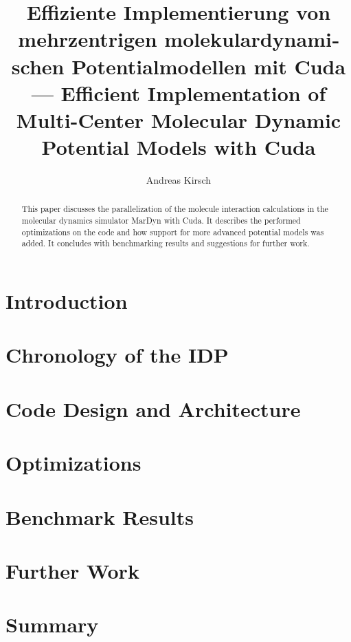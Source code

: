 \documentclass[11pt,a4paper,onecolumn,notitlepage]{scrartcl}
\author{Andreas Kirsch}
\title{\foreignlanguage{ngerman}{Effiziente Implementierung von mehrzentrigen molekulardynamischen Potentialmodellen mit Cuda} \linebreak --- \linebreak Efficient Implementation of Multi-Center Molecular Dynamic Potential Models with Cuda}
\newcommand{\cuda}{Cuda}
\begin{document}
\maketitle

\begin{abstract}
This paper discusses the parallelization of the molecule interaction calculations in the molecular dynamics simulator MarDyn with \cuda. It describes the performed optimizations on the code and how support for more advanced potential models was added. It concludes with benchmarking results and suggestions for further work.
\end{abstract}

\section{Introduction}



\section{Chronology of the IDP}



\section{Code Design and Architecture}



\section{Optimizations}



\section{Benchmark Results}



\section{Further Work}



\section{Summary}




\end{document}
